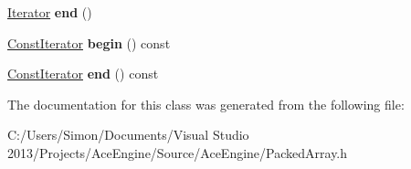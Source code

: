 \begin{DoxyCompactItemize}
\item 
\hypertarget{class_packed_array_af97fc05be0f100f5176743598b0bf8a2}{}\hyperlink{class_packed_array_1_1_iterator}{Iterator} {\bfseries end} ()\label{class_packed_array_af97fc05be0f100f5176743598b0bf8a2}

\item 
\hypertarget{class_packed_array_a674e7cc28a8aada5ba86c46fa3f436a6}{}\hyperlink{class_packed_array_1_1_const_iterator}{Const\+Iterator} {\bfseries begin} () const \label{class_packed_array_a674e7cc28a8aada5ba86c46fa3f436a6}

\item 
\hypertarget{class_packed_array_ab6e68fd1151b8281a0a639a6561a61ab}{}\hyperlink{class_packed_array_1_1_const_iterator}{Const\+Iterator} {\bfseries end} () const \label{class_packed_array_ab6e68fd1151b8281a0a639a6561a61ab}

\end{DoxyCompactItemize}


The documentation for this class was generated from the following file\+:\begin{DoxyCompactItemize}
\item 
C\+:/\+Users/\+Simon/\+Documents/\+Visual Studio 2013/\+Projects/\+Ace\+Engine/\+Source/\+Ace\+Engine/Packed\+Array.\+h\end{DoxyCompactItemize}

